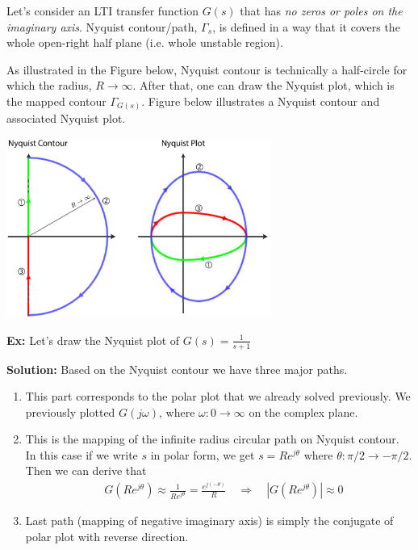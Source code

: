 \documentclass{article}
\begin{document}
\vspace{6 pt}

Let's consider an LTI transfer function $G(s)$ that 
has \textit{no zeros or poles on the imaginary axis}. Nyquist contour/path, 
$\Gamma_s$, is defined in a way that it covers the
whole open-right half plane (i.e. whole unstable region). 

As illustrated in the Figure below, 
Nyquist contour is technically a half-circle for which the radius, $R
\to \infty$. After that, one can draw the Nyquist plot, which is the
mapped contour $\Gamma_{G(s)}$. Figure below illustrates a Nyquist
contour and associated Nyquist plot. 

\vspace{6 pt}

  \begin{minipage}[h]{1\linewidth}
    \begin{center}
      \includegraphics[width=0.65\textwidth]{nyq}
    \end{center}
  \end{minipage}

\newpage

\textbf{Ex:} Let's draw the Nyquist plot of $G(s) = \frac{1}{s+1}$ 

\textbf{Solution:}  Based on the Nyquist contour we have three major
paths. 
%
\begin{enumerate}
  \item This part corresponds to the polar plot that we already solved previously. We previously 
  plotted $G(j \omega)$, where $\omega : 0 \to \infty$ on the complex plane.
%
  \item This is the mapping of the infinite radius circular path on
    Nyquist contour. In this case if we write $s$ in polar form, we get 
   $s = R e^{j \theta}$ where $\theta : \pi/2 \to -\pi/2$.  Then 
   we can derive that  
   \begin{align*}
     & G \left( R e^{j \theta} \right)  \approx \frac{1}{R e^{j
       \theta}} = \frac{e^{j (-\theta)}}{R}
       \quad  \Rightarrow \quad | G \left( R e^{j \theta} \right) | \approx 0
   \end{align*}
   \item Last path (mapping of negative imaginary axis) is simply 
    the conjugate of polar plot with reverse direction. 
\end{enumerate}
\end{document}
